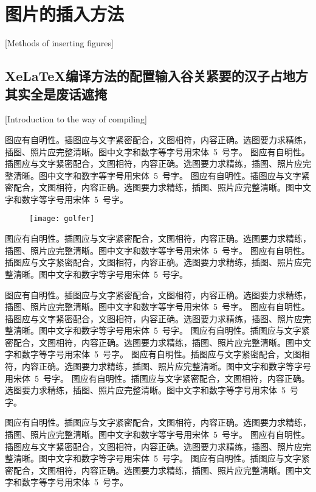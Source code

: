 
\chapter{图片的插入方法}[Methods of inserting figures]

\section{XeLaTeX编译方法的配置输入谷关紧要的汉子占地方其实全是废话遮掩}[Introduction to the \XeLaTeX way of compiling]

图应有自明性。插图应与文字紧密配合，文图相符，内容正确。选图要力求精练，插图、照片应完整清晰。图中文字和数字等字号用宋体~5~号字。
图应有自明性。插图应与文字紧密配合，文图相符，内容正确。选图要力求精练，插图、照片应完整清晰。图中文字和数字等字号用宋体~5~号字。
图应有自明性。插图应与文字紧密配合，文图相符，内容正确。选图要力求精练，插图、照片应完整清晰。图中文字和数字等字号用宋体~5~号字。
\begin{figure}[htpb]
\centering
\texttt{[image: golfer]}
\end{figure}
图应有自明性。插图应与文字紧密配合，文图相符，内容正确。选图要力求精练，插图、照片应完整清晰。图中文字和数字等字号用宋体~5~号字。
图应有自明性。插图应与文字紧密配合，文图相符，内容正确。选图要力求精练，插图、照片应完整清晰。图中文字和数字等字号用宋体~5~号字。

图应有自明性。插图应与文字紧密配合，文图相符，内容正确。选图要力求精练，插图、照片应完整清晰。图中文字和数字等字号用宋体~5~号字。
图应有自明性。插图应与文字紧密配合，文图相符，内容正确。选图要力求精练，插图、照片应完整清晰。图中文字和数字等字号用宋体~5~号字。
图应有自明性。插图应与文字紧密配合，文图相符，内容正确。选图要力求精练，插图、照片应完整清晰。图中文字和数字等字号用宋体~5~号字。
图应有自明性。插图应与文字紧密配合，文图相符，内容正确。选图要力求精练，插图、照片应完整清晰。图中文字和数字等字号用宋体~5~号字。
图应有自明性。插图应与文字紧密配合，文图相符，内容正确。选图要力求精练，插图、照片应完整清晰。图中文字和数字等字号用宋体~5~号字。

图应有自明性。插图应与文字紧密配合，文图相符，内容正确。选图要力求精练，插图、照片应完整清晰。图中文字和数字等字号用宋体~5~号字。
图应有自明性。插图应与文字紧密配合，文图相符，内容正确。选图要力求精练，插图、照片应完整清晰。图中文字和数字等字号用宋体~5~号字。
图应有自明性。插图应与文字紧密配合，文图相符，内容正确。选图要力求精练，插图、照片应完整清晰。图中文字和数字等字号用宋体~5~号字。

